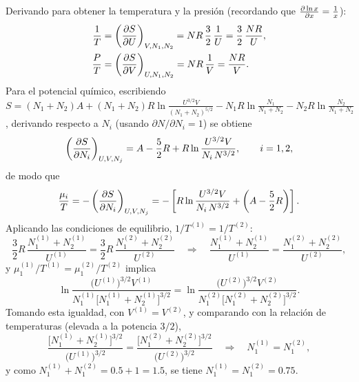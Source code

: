 \begin{solucion}
  Derivando para obtener la temperatura y la presión (recordando que $\pdv{\ln x}{x}=\frac{1}{x}$):
  \begin{align*}
    \frac{1}{T}&=\left(\frac{\partial S}{\partial U}\right)_{V,N_1,N_2}=NR\,\frac{3}{2}\,\frac{1}{U}=\frac{3}{2}\,\frac{NR}{U},\\
    \frac{P}{T}&=\left(\frac{\partial S}{\partial V}\right)_{U,N_1,N_2}=NR\,\frac{1}{V}=\frac{NR}{V}.
  \end{align*}
  Para el potencial químico, escribiendo $S=(N_1+N_2)A+(N_1+N_2)R\ln\frac{U^{3/2}V}{(N_1+N_2)^{5/2}}-N_1R\ln\frac{N_1}{N_1+N_2}-N_2R\ln\frac{N_2}{N_1+N_2}$,
  derivando respecto a $N_i$ (usando $\partial N/\partial N_i=1$) se obtiene
  \begin{equation*}
    \left(\frac{\partial S}{\partial N_i}\right)_{U,V,N_j}=A-\frac{5}{2}R+R\ln\frac{U^{3/2}V}{N_i\,N^{3/2}},\qquad i=1,2,
  \end{equation*}
  de modo que
  \begin{equation*}
    \frac{\mu_i}{T}=-\left(\frac{\partial S}{\partial N_i}\right)_{U,V,N_j}=-\left[R\ln\frac{U^{3/2}V}{N_i\,N^{3/2}}+\left(A-\frac{5}{2}R\right)\right].
  \end{equation*}
  Aplicando las condiciones de equilibrio, $1/T^{(1)}=1/T^{(2)}$:
  \begin{equation*}
    \frac{3}{2}R\,\frac{N_1^{(1)}+N_2^{(1)}}{U^{(1)}}=\frac{3}{2}R\,\frac{N_1^{(2)}+N_2^{(2)}}{U^{(2)}}
    \quad\Longrightarrow\quad
    \frac{N_1^{(1)}+N_2^{(1)}}{U^{(1)}}=\frac{N_1^{(2)}+N_2^{(2)}}{U^{(2)}},
  \end{equation*}
  y $\mu_1^{(1)}/T^{(1)}=\mu_1^{(2)}/T^{(2)}$ implica
  \begin{equation*}
    \ln\frac{\bigl(U^{(1)}\bigr)^{3/2}V^{(1)}}{N_1^{(1)}\bigl[N_1^{(1)}+N_2^{(1)}\bigr]^{3/2}}
    =\ln\frac{\bigl(U^{(2)}\bigr)^{3/2}V^{(2)}}{N_1^{(2)}\bigl[N_1^{(2)}+N_2^{(2)}\bigr]^{3/2}}.
  \end{equation*}
  Tomando esta igualdad, con $V^{(1)}=V^{(2)}$, y comparando con la relación de temperaturas
  (elevada a la potencia $3/2$),
  \begin{equation*}
    \frac{\bigl[N_1^{(1)}+N_2^{(1)}\bigr]^{3/2}}{\bigl(U^{(1)}\bigr)^{3/2}}=\frac{\bigl[N_1^{(2)}+N_2^{(2)}\bigr]^{3/2}}{\bigl(U^{(2)}\bigr)^{3/2}}
    \quad\Longrightarrow\quad
    N_1^{(1)}=N_1^{(2)},
  \end{equation*}
  y como $N_1^{(1)}+N_1^{(2)}=0.5+1=1.5$, se tiene $\boxed{N_1^{(1)}=N_1^{(2)}=0.75}$.


\end{solucion}
